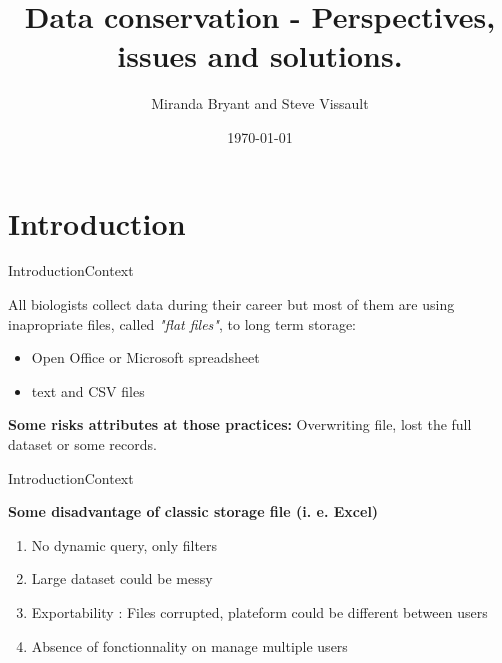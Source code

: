 \documentclass{eecslides}
\title[]{Data conservation - Perspectives, issues and solutions.}
\author[]{\color{white}  Miranda Bryant and Steve Vissault}
\institute[\color{white} UQAR]{\color{white} \textbf{Les midis numériques}}
\date{ \color{white} \today}
\begin{document}
\begin{frame}[plain]
\titlepage
\end{frame}


\section{Introduction}

\begin{frame}{Introduction}{Context}

All biologists collect data during their career but most of them are using \alert{inapropriate files}, called \textit{"flat files"}, to long term storage:

\begin{itemize}
	\item  Open Office or Microsoft spreadsheet
	\item  text and CSV files
\end{itemize}

\textbf{Some risks attributes at those practices:} Overwriting file, lost the full dataset or some records.

\end{frame}


\begin{frame}{Introduction}{Context}

\textbf{\alert{Some disadvantage of classic storage file (i. e. Excel)}}

\begin{enumerate}
	\item No dynamic query, only filters
	\item Large dataset could be messy
	\item Exportability : Files corrupted, plateform could be different between users
	\item Absence of fonctionnality on manage multiple users
\end{enumerate}



\end{frame}

\end{document}
